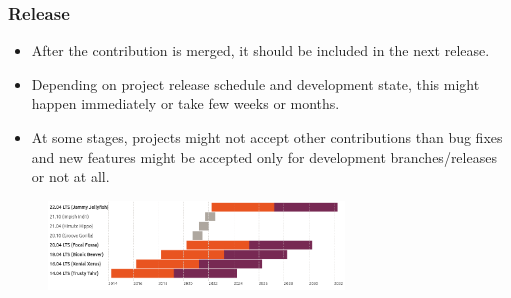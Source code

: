 \documentclass[aspectratio=169]{beamer}              %
\begin{document}
\begin{frame}
	\frametitle{Release}
	
\begin{block}{}
		\begin{itemize}
			\item After the contribution is merged, it should be included in the next release.
			\item Depending on project release schedule and development state, this might happen immediately or take few weeks or months.
			\item At some stages, projects might not accept other contributions than bug fixes and new features might be accepted only for development branches/releases or not at all.
		\end{itemize}
\end{block}
\begin{figure}[ht!]
	\begin{center}
  	  \includegraphics[width=0.7\textwidth]{img/ubuntu-releases.png}
	\end{center}
\end{figure}

\end{frame}
\end{document}

